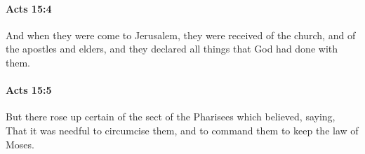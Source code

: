 		\paragraph{Acts 15:4} %
			\label{ACTS-15-4}

			And when they were come to Jerusalem, they were received of the church, and of the apostles and elders, and they declared all things that God had done with them.

			\begin{framed}
			\scriptsize
				\begin{compactdesc}
					\item[SBLG] 
				\end{compactdesc}
			\end{framed}

		\paragraph{Acts 15:5} %
			\label{ACTS-15-5}

			But there rose up certain of the sect of the Pharisees which believed, saying, That it was needful to circumcise them, and to command them to keep the law of Moses.

